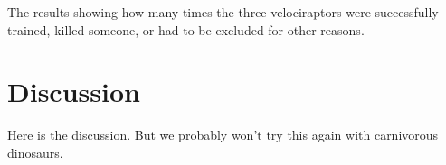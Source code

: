 \begin{table}
  \centering
  \caption[Results of dinosaur training]{
    The results showing how many times the three velociraptors were successfully trained, killed someone, or had to be excluded for other reasons.
  }
  \singlespacing
  \label{tab:dinosaur}
\end{table}

\section{Discussion}

Here is the discussion. But we probably won't try this again with carnivorous dinosaurs.
